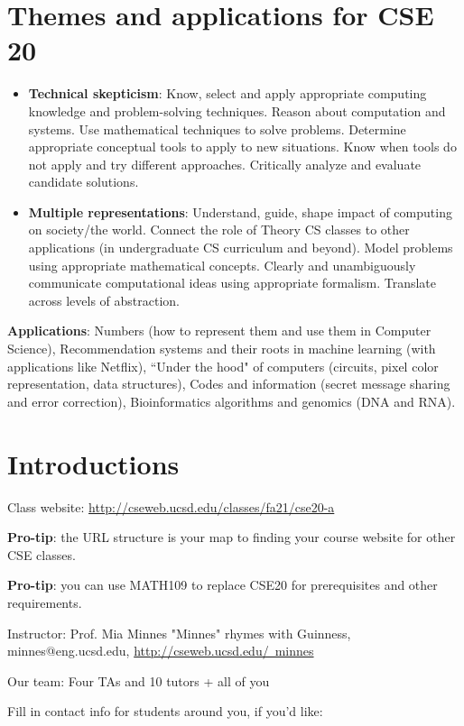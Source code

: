 \documentclass[12pt, oneside]{article}
\begin{document}
\section*{Themes and applications for CSE 20}
\begin{itemize}
\item {\bf Technical skepticism}: Know, select and apply appropriate computing knowledge and problem-solving techniques. 
Reason about computation and systems. 
Use mathematical techniques to solve problems. 
Determine appropriate conceptual tools to apply to new situations. 
Know when tools do not apply and try different approaches. 
Critically analyze and evaluate candidate solutions.
\item {\bf Multiple representations}: Understand, guide, shape impact of computing on society/the world. 
Connect the role of Theory CS classes to other applications (in undergraduate CS curriculum and beyond). 
Model problems using appropriate mathematical concepts.
Clearly and unambiguously communicate computational ideas using appropriate formalism. 
Translate across levels of abstraction.
\end{itemize}

{\bf Applications}: Numbers (how to represent them and use them in Computer Science), 
Recommendation systems and their roots in machine learning (with applications like Netflix),
``Under the hood" of computers (circuits, pixel color representation, data structures),
Codes and information (secret message sharing and error correction),
Bioinformatics algorithms and genomics (DNA and RNA).

\section*{Introductions}
Class website: \href{http://cseweb.ucsd.edu/classes/fa21/cse20-a}{http://cseweb.ucsd.edu/classes/fa21/cse20-a}

{\bf Pro-tip}: the URL structure is your map to finding your course website for other CSE classes.

{\bf Pro-tip}: you can use MATH109 to replace CSE20 for prerequisites and other requirements.

Instructor: Prof. Mia Minnes {\tiny{"Minnes" rhymes with Guinness}}, minnes@eng.ucsd.edu, 
\href{http://cseweb.ucsd.edu/~minnes}{http://cseweb.ucsd.edu/~minnes}

Our team: Four TAs and 10 tutors + all of you

Fill in contact info for students around you, if you'd like:
\vspace{50pt}
\end{document}
